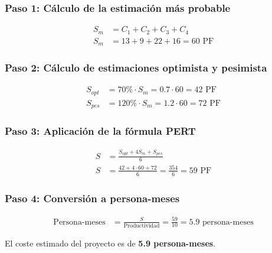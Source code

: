\subsubsection{Paso 1: Cálculo de la estimación más probable}
\begin{align}
    S_m &= C_1 + C_2 + C_3 + C_4\\
    S_m &= 13 + 9 + 22 + 16 = \boxed{60 \text{ PF}}
\end{align}

\subsubsection{Paso 2: Cálculo de estimaciones optimista y pesimista}
\begin{align}
    S_{opt} &= 70\% \cdot S_m = 0.7 \cdot 60 = \boxed{42 \text{ PF}}\\
    S_{pes} &= 120\% \cdot S_m = 1.2 \cdot 60 = \boxed{72 \text{ PF}}
\end{align}

\subsubsection{Paso 3: Aplicación de la fórmula PERT}
\begin{align}
    S &= \frac{S_{opt} + 4S_m + S_{pes}}{6}\\
    S &= \frac{42 + 4 \cdot 60 + 72}{6} = \frac{354}{6} = \boxed{59 \text{ PF}}
\end{align}

\subsubsection{Paso 4: Conversión a persona-meses}
\begin{align}
    \text{Persona-meses} &= \frac{S}{\text{Productividad}} = \frac{59}{10} = \boxed{5.9 \text{ persona-meses}}
\end{align}

\begin{solucion}
    El coste estimado del proyecto es de \textbf{5.9 persona-meses}.
\end{solucion}
